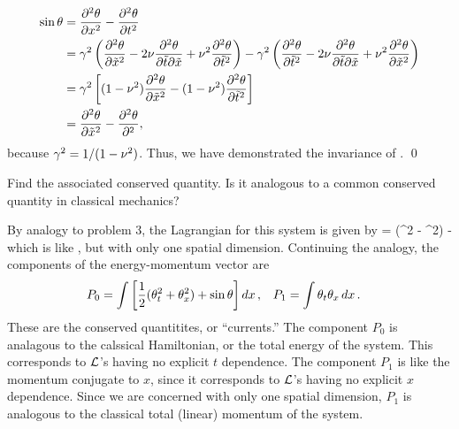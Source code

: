 \begin{solution}
\begin{align*}
		\sin{\theta} &= \pdv[2]{\theta}{x} - \pdv[2]{\theta}{t} \\
		&= \gamma^2 \left( \pdv[2]{\theta}{\tilde{x}} - 2 \nu \pdv{\theta}{\tilde{t}}{\tilde{x}} + \nu^2 \pdv[2]{\theta}{\tilde{t}} \right) - \gamma^2 \left( \pdv[2]{\theta}{\tilde{t}} - 2 \nu \pdv{\theta}{\tilde{t}}{\tilde{x}} + \nu^2 \pdv[2]{\theta}{\tilde{x}} \right) \\
		&= \gamma^2 \left[ (1 - \nu^2) \pdv[2]{\theta}{\tilde{x}} - (1 - \nu^2) \pdv[2]{\theta}{\tilde{t}} \right] \\
		&= \pdv[2]{\theta}{\tilde{x}} - \pdv[2]{\theta}{\tt},
	\end{align*}
	because $\gamma^2 = 1 / (1 - \nu^2)$.  Thus, we have demonstrated the invariance of . \qed
\end{solution}

\begin{problem}
	Find the associated conserved quantity.  Is it analogous to a common conserved quantity in classical mechanics?
\end{problem}

\begin{solution}
	By analogy to problem 3, the Lagrangian for this system is given by
	\beq
		\Ld =  (\thtt^2 - \thtx^2) - \sint
	\eeq
	which is like , but with only one spatial dimension.  Continuing the analogy, the components of the energy-momentum vector are
	\begin{align*}
		P_0 &= \int \left[ \frac{1}{2} (\theta_t^2 + \theta_x^2) + \sin{\theta} \right] \dd{x}, &
		P_1 &= \int \theta_t \theta_x \dd{x}. &
	\end{align*}
	These are the conserved quantitites, or ``currents.''  The component $P_0$ is analagous to the calssical Hamiltonian, or the total energy of the system.  This corresponds to $\mathcal{L}$'s having no explicit $t$ dependence.  The component $P_1$ is like the momentum conjugate to $x$, since it corresponds to $\mathcal{L}$'s having no explicit $x$ dependence.  Since we are concerned with only one spatial dimension, $P_1$ is analogous to the classical total (linear) momentum of the system.
\end{solution}